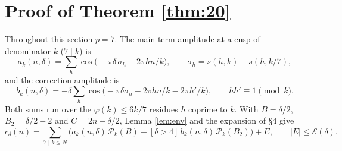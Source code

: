 \documentclass[11pt]{amsart}
\theoremstyle{remark}
\newcommand{\cP}{\mathcal P}\newcommand{\cE}{\mathcal E}\newcommand{\e}{\mathrm e}
\begin{document}
\section{Proof of Theorem \ref{thm:20}}\label{sec:20}
Throughout this section $p=7$. The main-term amplitude at a cusp of denominator $k$ ($7\mid k$) is
\[
a_k(n,\delta)=\sum_{h}\cos\big(-\pi\delta\,\sigma_h-2\pi hn/k\big),\qquad \sigma_h=s(h,k)-s(h,k/7),
\]
and the correction amplitude is
\[
b_k(n,\delta)=-\delta\sum_h\cos\big(-\pi\delta\sigma_h-2\pi hn/k-2\pi h'/k\big),\qquad hh'\equiv1\pmod k .
\]
Both sums run over the $\varphi(k)\le 6k/7$ residues $h$ coprime to $k$. With $B=\delta/2$, $B_2=\delta/2-2$ and $C=2n-\delta/2$, Lemma \ref{lem:env} and the expansion of \S4 give
\begin{equation}\label{eq:G7exp}
c_\delta(n)=\sum_{7\mid k\le N}\Big(a_k(n,\delta)\,\cP_k(B)+[\delta>4]\,b_k(n,\delta)\,\cP_k(B_2)\Big)+E,\qquad |E|\le\cE(\delta).
\end{equation}
\end{document}
